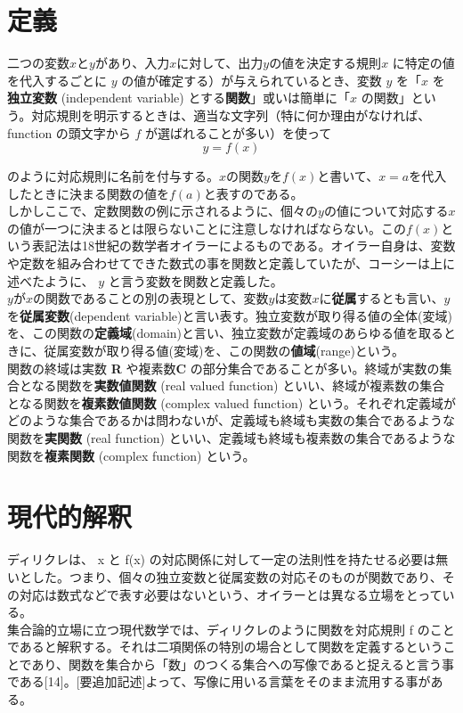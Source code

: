 \documentclass[a4j,12pt]{jreport}
\begin{document}
\chapter{定義}
二つの変数$x$と$y$があり、入力$x$に対して、出力$y$の値を決定する規則$x$ に特定の値を代入するごとに $y$ の値が確定する）が与えられているとき、変数 $y$ を「$x$ を{\bf 独立変数} (independent variable) とする{\bf 関数}」或いは簡単に「$x$ の関数」という。対応規則を明示するときは、適当な文字列（特に何か理由がなければ、function の頭文字から $f$ が選ばれることが多い）を使って\\

\begin{equation}
y = f(x)
\end{equation}

のように対応規則に名前を付与する。$x$の関数$y$を$f(x)$と書いて、$x=a$を代入したときに決まる関数の値を$f(a)$と表すのである。\\
しかしここで、定数関数の例に示されるように、個々の$y$の値について対応する$x$の値が一つに決まるとは限らないことに注意しなければならない。この$f(x)$という表記法は18世紀の数学者オイラーによるものである。オイラー自身は、変数や定数を組み合わせてできた数式の事を関数と定義していたが、コーシーは上に述べたように、 $y$ と言う変数を関数と定義した。\\
$y$が$x$の関数であることの別の表現として、変数$y$は変数$x$に{\bf 従属}するとも言い、$y$を{\bf 従属変数}(dependent variable)と言い表す。独立変数が取り得る値の全体(変域)を、この関数の{\bf 定義域}(domain)と言い、独立変数が定義域のあらゆる値を取るときに、従属変数が取り得る値(変域)を、この関数の{\bf 値域}(range)という。\\
関数の終域は実数 {\bf R} や複素数{\bf C} の部分集合であることが多い。終域が実数の集合となる関数を{\bf 実数値関数} (real valued function) といい、終域が複素数の集合となる関数を{\bf 複素数値関数} (complex valued function) という。それぞれ定義域がどのような集合であるかは問わないが、定義域も終域も実数の集合であるような関数を{\bf 実関数} (real function) といい、定義域も終域も複素数の集合であるような関数を{\bf 複素関数} (complex function) という。\\

\chapter{現代的解釈}
ディリクレは、 x と f(x) の対応関係に対して一定の法則性を持たせる必要は無いとした。つまり、個々の独立変数と従属変数の対応そのものが関数であり、その対応は数式などで表す必要はないという、オイラーとは異なる立場をとっている。\\
集合論的立場に立つ現代数学では、ディリクレのように関数を対応規則 f のことであると解釈する。それは二項関係の特別の場合として関数を定義するということであり、関数を集合から「数」のつくる集合への写像であると捉えると言う事である[14]。[要追加記述]よって、写像に用いる言葉をそのまま流用する事がある。
\end{document}
